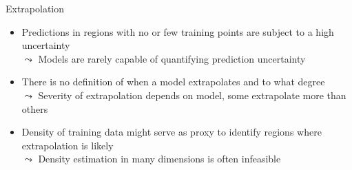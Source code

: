 \documentclass[11pt,compress,t,notes=noshow, aspectratio=169, xcolor=table]{beamer}
\begin{document}
\begin{frame}{Extrapolation}
\begin{itemize}
\item Predictions in regions with no or few training points are subject to a high uncertainty\\
$\leadsto$ Models are rarely capable of quantifying prediction uncertainty
\item There is no definition of when a model extrapolates and to what degree \\
$\leadsto$ Severity of extrapolation depends on model, some extrapolate more than others %
\item Density of training data might serve as proxy to identify regions where extrapolation is likely\\
$\leadsto$ Density estimation in many dimensions is often infeasible
\end{itemize}

\end{frame}

\end{document}
